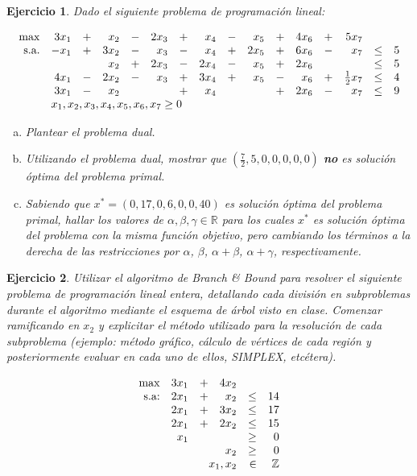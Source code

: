 \documentclass[a4paper,oneside,12pt]{amsart}
\newtheorem{quest}{Ejercicio}
\begin{document}
\begin{quest} 
Dado el siguiente problema de programación lineal:

\[\begin{array}{rrrrrrrrrrrrrrrr}
    \max & 3x_1 & + & x_2 & - & 2x_3 & + & x_4 & - & x_5 & + & 4x_6 & + & 5x_7 & &\\
    \text{s.a.} & -x_1 & + & 3x_2 & - & x_3 & - & x_4 & + & 2x_5 & + & 6x_6 & - & x_7 & \leq & 5 \\
    &  &  & x_2 & + & 2x_3 & - & 2x_4 & - & x_5 & + & 2x_6 & & &\leq & 5 \\
    & 4x_1 & - & 2x_2 & - & x_3 & + & 3x_4 & + & x_5 & - & x_6 & + &\frac{1}{2}x_7 & \leq & 4 \\
    & 3x_1 & - & x_2  &  &  & + & x_4 &  &  & + & 2x_6 & -&x_7 &\leq & 9 \\
    & \multicolumn{15}{l}{x_1,x_2,x_3,x_4,x_5,x_6,x_7\geq 0}
\end{array}
\]

\begin{enumerate}[a)]
    \item Plantear el problema dual.
    \item Utilizando el problema dual, mostrar que $(\frac{7}{2},5,0,0,0,0,0)$ \textbf{no} es solución óptima del problema primal.
    \item Sabiendo que $x^\ast = (0,17,0,6,0,0,40)$ es solución óptima del problema primal, hallar los valores de $\alpha,\beta, \gamma\in \mathbb{R}$ para los cuales $x^\ast $ es solución óptima del problema con la misma función objetivo, pero cambiando los términos a la derecha de las restricciones por $\alpha$, $\beta$, $\alpha+\beta$, $\alpha+\gamma$, respectivamente.
\end{enumerate}
\end{quest}




\begin{quest} 
Utilizar el algoritmo de Branch \& Bound para resolver el siguiente problema de programaci\'on lineal entera, detallando cada divisi\'on en subproblemas durante el algoritmo mediante el esquema de \'arbol visto en clase. Comenzar ramificando en $x_2$ y explicitar el m\'etodo utilizado para la resoluci\'on de cada subproblema (ejemplo: m\'etodo gr\'afico, c\'alculo de v\'ertices de cada regi\'on y posteriormente evaluar en cada uno de ellos, SIMPLEX, etc\'etera). 

\[\begin{array}{rrrrrrrrc}
\max & 3x_1 & + & 4x_2 &  &   \\
\text{s.a:}	 & 2x_1 & + & x_2 & \leq & 14  \\
			 & 2x_1 & + & 3x_2 & \leq & 17 \\
			 &2x_1 & +  & 2x_2 & \leq & 15 \\
			 &	x_1    &  & & \geq & 0 \\
			 & & & x_2 & \geq & 0 \\
			 & \multicolumn{3}{r}{x_1,x_2} & \in & \mathbb{Z} 
\end{array}
\]



\end{quest}


\end{document}
